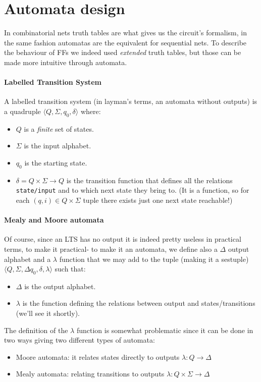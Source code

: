 \documentclass{scrartcl}
\begin{document}
    \section{Automata design} In combinatorial nets truth tables are what gives us the circuit's formalism, in the same fashion automatas are the equivalent for sequential nets. To describe the behaviour of FFs we indeed used \emph{extended} truth tables, but those can be made more intuitive through automata.
    \paragraph{Labelled Transition System} A labelled transition system (in layman's terms, an automata without outputs) is a quadruple $\langle Q, \Sigma, q_0, \delta\rangle$ where:
    \begin{itemize}
        \item $Q$ is a \emph{finite} set of states.
        \item $\Sigma$ is the input alphabet.
        \item $q_0$ is the starting state.
        \item $\delta= Q\times\Sigma\to Q$ is the transition function that defines all the relations \texttt{state/input} and to which next state they bring to. (It is a function, so for each $(q,i)\in Q\times\Sigma$ tuple there exists just one next state reachable!)
    \end{itemize}
    \paragraph{Mealy and Moore automata} Of course, since an LTS has no output it is indeed pretty useless in practical terms, to make it practical- to make it an automata, we define also a $\Delta$ output alphabet and a $\lambda$ function that we may add to the tuple (making it a sestuple) $\langle Q, \Sigma,\Delta q_0, \delta,\lambda\rangle$ such that:
    \begin{itemize}
        \item $\Delta$ is the output alphabet.
        \item $\lambda$ is the function defining the relations between output and states/transitions (we'll see it shortly).
    \end{itemize}
    The definition of the $\lambda$ function is somewhat problematic since it can be done in two ways giving two different types of automata:
    \begin{itemize}
        \item Moore automata: it relates states directly to outputs $\lambda:Q\to\Delta$
        \item Mealy automata: relating transitions to outputs $\lambda:Q\times\Sigma\to\Delta$
    \end{itemize}
\end{document}
